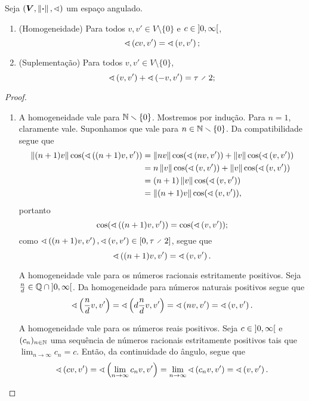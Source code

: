 \begin{proposition}
Seja $(\bm V, \left\Vert{\bm{\cdot}}\right\Vert,\sphericalangle)$ um espaço angulado.
	\begin{enumerate}
		\item (Homogeneidade) Para todos $v,v' \in V \setminus \{0\}$ e $c \in \left]0,\allowbreak \infty\right[$,
			\begin{equation*}
				\sphericalangle\left({cv},{v'}\right) = \sphericalangle\left({v},{v'}\right);
			\end{equation*}
		\item (Suplementação) Para todos $v,v' \in V \setminus \{0\}$,
			\begin{equation*}
				\ang{v}{v'} + \ang{-v}{v'} = \tau \div 2;
			\end{equation*}
	\end{enumerate}
\end{proposition}
\begin{proof}
	\begin{enumerate}
		\item A homogeneidade vale para $\mathbb{N} \smallsetminus \{0\}$. Mostremos por indução. Para $n=1$, claramente vale. Suponhamos que vale para $n \in \mathbb{N} \smallsetminus \{0\}$. Da compatibilidade segue que
			\begin{align*}
				\left\Vert{(n+1)v}\right\Vert\cos(\sphericalangle\left({(n+1)v},{v'}\right)) &= \left\Vert{nv}\right\Vert\cos(\sphericalangle\left({nv},{v'}\right)) + \left\Vert{v}\right\Vert\cos(\sphericalangle\left({v},{v'}\right)) \\
					&=n\left\Vert{v}\right\Vert\cos(\sphericalangle\left({v},{v'}\right)) + \left\Vert{v}\right\Vert\cos(\sphericalangle\left({v},{v'}\right)) \\
					&= (n+1)\left\Vert{v}\right\Vert\cos(\sphericalangle\left({v},{v'}\right)) \\
					&= \left\Vert{(n+1)v}\right\Vert\cos(\sphericalangle\left({v},{v'}\right)),
			\end{align*}
		portanto
		\begin{equation*}
			\cos(\sphericalangle\left({(n+1)v},{v'}\right)) = \cos(\sphericalangle\left({v},{v'}\right));
		\end{equation*}
		como $\ang{(n+1)v}{v'}, \ang{v}{v'} \in \intff{0}{\tau \div 2}$, segue que
			\begin{equation*}
				\sphericalangle\left({(n+1)v},{v'}\right) = \sphericalangle\left({v},{v'}\right).
			\end{equation*}

		A homogeneidade vale para os números racionais estritamente positivos. Seja $\frac{n}{d} \in \mathbb{Q} \cap \left]0,\allowbreak \infty\right[$. Da homogeneidade para números naturais positivos segue que
			\begin{equation*}
				\sphericalangle\left({\frac{n}{d}v},{v'}\right) = \sphericalangle\left({d\frac{n}{d}v},{v'}\right) = \sphericalangle\left({nv},{v'}\right) = \sphericalangle\left({v},{v'}\right).
			\end{equation*}

		A homogeneidade vale para os números reais positivos. Seja $c \in \left]0,\allowbreak \infty\right[$ e $(c_n)_{n \in \mathbb{N}}$ uma sequência de números racionais estritamente positivos tais que $\lim_{n \to \infty} c_n = c$. Então, da continuidade do ângulo, segue que
			\begin{equation*}
				\sphericalangle\left({cv},{v'}\right) = \sphericalangle\left({\lim_{n \to \infty} c_n v},{v'}\right) = \lim_{n \to \infty} \sphericalangle\left({c_n v},{v'}\right) = \sphericalangle\left({v},{v'}\right).
			\end{equation*}


\end{enumerate}
\end{proof}
